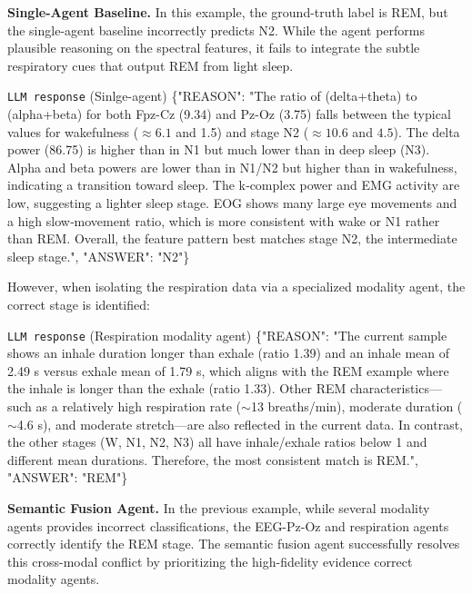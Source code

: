 \noindent \textbf{Single-Agent Baseline.} In this example, the ground-truth label is REM, but the single-agent baseline incorrectly predicts N2. While the agent performs plausible reasoning on the spectral features, it fails to integrate the subtle respiratory cues that output REM from light sleep.

\begin{promptbox}{\texttt{LLM response} (Sinlge-agent)}
\{"REASON": "The ratio of (delta+theta) to (alpha+beta) for both Fpz-Cz (9.34) and Pz-Oz (3.75) falls between the typical values for wakefulness ($\approx6.1$ and 1.5) and stage N2 ($\approx10.6$ and $4.5$). The delta power (86.75) is higher than in N1 but much lower than in deep sleep (N3). Alpha and beta powers are lower than in N1/N2 but higher than in wakefulness, indicating a transition toward sleep. The k‑complex power and EMG activity are low, suggesting a lighter sleep stage. EOG shows many large eye movements and a high slow‑movement ratio, which is more consistent with wake or N1 rather than REM. Overall, the feature pattern best matches stage N2, the intermediate sleep stage.", "ANSWER": "N2"\}
\end{promptbox}

However, when isolating the respiration data via a specialized modality agent, the correct stage is identified:

\begin{promptbox}{\texttt{LLM response} (Respiration modality agent)}
\{"REASON": "The current sample shows an inhale duration longer than exhale (ratio 1.39) and an inhale mean of 2.49 s versus exhale mean of 1.79 s, which aligns with the REM example where the inhale is longer than the exhale (ratio 1.33). Other REM characteristics—such as a relatively high respiration rate ($\sim$13 breaths/min), moderate duration ($\sim$4.6 s), and moderate stretch—are also reflected in the current data. In contrast, the other stages (W, N1, N2, N3) all have inhale/exhale ratios below 1 and different mean durations. Therefore, the most consistent match is REM.", "ANSWER": "REM"\}
\end{promptbox}

\noindent \textbf{Semantic Fusion Agent.} In the previous example, while several modality agents provides incorrect classifications, the EEG-Pz-Oz and respiration agents correctly identify the REM stage. The semantic fusion agent successfully resolves this cross-modal conflict by prioritizing the high-fidelity evidence correct modality agents.

